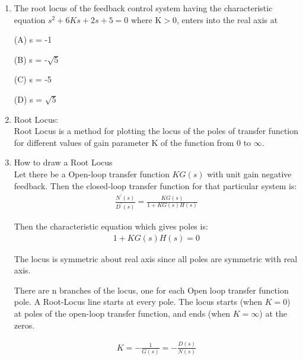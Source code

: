 \begin{enumerate}[label=\thesection.\arabic*.,ref=\thesection.\theenumi]
\item The root locus of the feedback control system having the characteristic equation $ s^2 + 6Ks + 2s + 5 = 0 $ where
K$>$0, enters into the real axis at

(A) s = -1

(B) s = -$\sqrt{5}$

(C) s = -5

(D) s = $\sqrt{5}$


\solution

\item Root Locus: \\
	  Root Locus is a method for plotting the locus of the poles of transfer function for different values of gain parameter K of the function from 0 to $\infty$.

\item How to draw a Root Locus	\\
     Let there be a Open-loop transfer function  $KG(s)$  with unit gain negative feedback. Then the closed-loop transfer function for that particular system is:
    \begin{align}
         \frac{N^{'}(s)}{D^{'}(s)}=\frac{K G(s)}{1+K G(s) H(s)}    
    \end{align}
    
     Then the characteristic equation which gives poles is: 
    \begin{align}
        1+KG(s)H(s)=0
    \end{align}
    
     The locus is symmetric about real axis since all poles are symmetric with real axis.
     
    There are n branches of the locus, one for each Open loop transfer function pole. A Root-Locus line starts at every pole. The locus starts (when $K = 0$) at poles of the open-loop transfer function, and ends (when $K = \infty$) at the zeros.
    
    
    \begin{align}
        K=-\frac{1}{G(s)}=-\frac{D(s)}{N(s)}    
    \end{align}


\end{enumerate}
